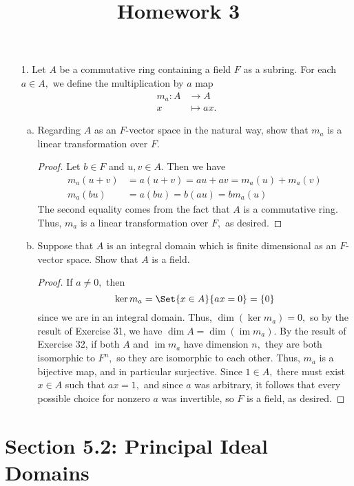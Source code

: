 \documentclass{article}
\DeclareMathOperator{\ima}{im}
\begin{document}
\title{Homework 3}
\maketitle
\thispagestyle{fancy}

\begin{itemize}
	\item[1.] Let $A$ be a commutative ring containing a field $F$ as a subring. For each $a\in A,$ we define the multiplication by $a$ map
		\begin{align*}
			m_a: A &\to A \\
			x &\mapsto ax.
		\end{align*}
		\begin{enumerate}[(a)]
			\item Regarding $A$ as an $F$-vector space in the natural way, show that $m_a$ is a linear transformation over $F.$
				\begin{proof}
					Let $b\in F$ and $u, v\in A.$ Then we have
					\begin{align*}
						m_a(u+v) &= a(u+v) = au + av = m_a(u) + m_a(v) \\
						m_a(bu) &= a(bu) = b(au) = bm_a(u)
					\end{align*}
					The second equality comes from the fact that $A$ is a commutative ring. Thus, $m_a$ is a linear transformation over $F,$ as desired.
				\end{proof}

			\item Suppose that $A$ is an integral domain which is finite dimensional as an $F$-vector space. Show that $A$ is a field.
				\begin{proof}
					If $a\neq 0,$ then 
					\[\ker m_a=\Set{x\in A}{ax=0}=\left\{ 0 \right\}\]
					since we are in an integral domain. Thus, $\dim(\ker m_a)=0,$ so by the result of Exercise 31, we have $\dim A = \dim (\ima m_a).$ By the result of Exercise 32, if both $A$ and $\ima m_a$ have dimension $n,$ they are both isomorphic to $F^n,$ so they are isomorphic to each other. Thus, $m_a$ is a bijective map, and in particular surjective. Since $1\in A,$ there must exist $x\in A$ such that $ax=1,$ and since $a$ was arbitrary, it follows that every possible choice for nonzero $a$ was invertible, so $F$ is a field, as desired.
				\end{proof}
				
		\end{enumerate}
\end{itemize}

\section*{Section 5.2: Principal Ideal Domains}
\end{document}
